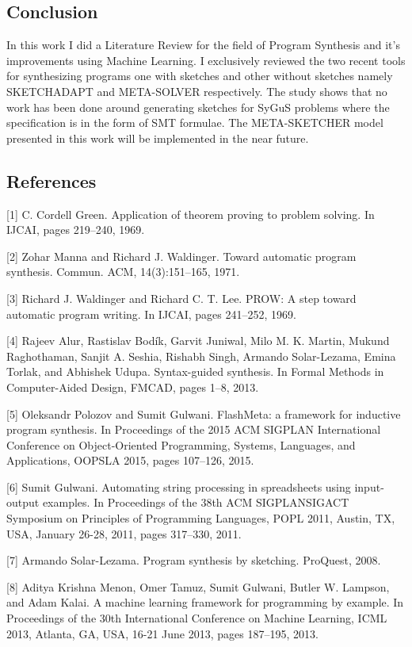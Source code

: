 \subsection{Conclusion}
In this work I did a Literature Review for the field of Program Synthesis and it's improvements using Machine Learning. I exclusively reviewed the two recent tools for synthesizing programs one with sketches and other without sketches namely SKETCHADAPT and META-SOLVER respectively. The study shows that no work has been done around generating sketches for SyGuS problems where the specification is in the form of SMT formulae. The META-SKETCHER model presented in this work will be implemented in the near future.

\subsection*{References}
\small

[1] C. Cordell Green. Application of theorem proving to problem solving. In IJCAI, pages 219–240, 1969.

[2] Zohar Manna and Richard J. Waldinger. Toward automatic program
synthesis. Commun. ACM, 14(3):151–165, 1971.

[3] Richard J. Waldinger and Richard C. T. Lee. PROW: A step toward
automatic program writing. In IJCAI, pages 241–252, 1969.

[4] Rajeev Alur, Rastislav Bodík, Garvit Juniwal, Milo M. K. Martin,
Mukund Raghothaman, Sanjit A. Seshia, Rishabh Singh, Armando
Solar-Lezama, Emina Torlak, and Abhishek Udupa. Syntax-guided
synthesis. In Formal Methods in Computer-Aided Design, FMCAD,
pages 1–8, 2013.

[5] Oleksandr Polozov and Sumit Gulwani. FlashMeta: a framework for
inductive program synthesis. In Proceedings of the 2015 ACM SIGPLAN
International Conference on Object-Oriented Programming, Systems,
Languages, and Applications, OOPSLA 2015, pages 107–126, 2015.

[6] Sumit Gulwani. Automating string processing in spreadsheets using input-output examples. In Proceedings of the 38th ACM SIGPLANSIGACT Symposium on Principles of Programming Languages, POPL
2011, Austin, TX, USA, January 26-28, 2011, pages 317–330, 2011.

[7] Armando Solar-Lezama. Program synthesis by sketching. ProQuest,
2008.

[8] Aditya Krishna Menon, Omer Tamuz, Sumit Gulwani, Butler W. Lampson, and Adam Kalai. A machine learning framework for programming by example. In Proceedings of the 30th International Conference on Machine Learning, ICML 2013, Atlanta, GA, USA, 16-21 June 2013,
pages 187–195, 2013.


